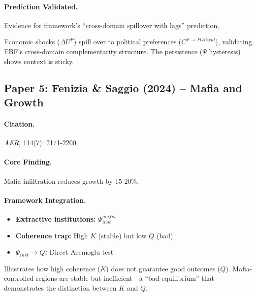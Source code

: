 \paragraph{Prediction Validated.}
Evidence for framework's ``cross-domain spillover with lags'' prediction.

\begin{tcolorbox}[colback=yellow!5!white, colframe=yellow!75!black,
    title=EBF Insight: Trade and Politics]
Economic shocks ($\Delta U^F$) spill over to political preferences
($C^{F \to Political}$), validating EBF's cross-domain complementarity
structure. The persistence ($\Psi$ hysteresis) shows context is sticky.
\end{tcolorbox}


\subsection{Paper 5: Fenizia \& Saggio (2024) -- Mafia and Growth}

\paragraph{Citation.}
\emph{AER}, 114(7): 2171-2200.

\paragraph{Core Finding.}
Mafia infiltration reduces growth by 15-20\%.

\paragraph{Framework Integration.}
\begin{itemize}
  \item \textbf{Extractive institutions:} $\Psi_{inst}^{mafia}$
  \item \textbf{Coherence trap:} High $K$ (stable) but low $Q$ (bad)
  \item \textbf{$\Psi_{inst} \to Q$:} Direct Acemoglu test
\end{itemize}

\begin{tcolorbox}[colback=yellow!5!white, colframe=yellow!75!black,
    title=EBF Insight: Extractive Institutions]
Illustrates how high coherence ($K$) does not guarantee good outcomes ($Q$).
Mafia-controlled regions are stable but inefficient---a ``bad equilibrium''
that demonstrates the distinction between $K$ and $Q$.
\end{tcolorbox}


